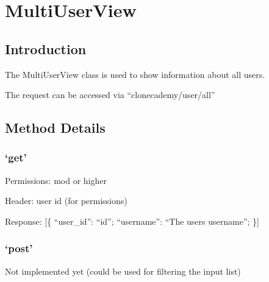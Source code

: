 \chapter*{MultiUserView}

\section*{Introduction}\label{introduction}

The MultiUserView class is used to show information about all users.

The request can be accessed via ``clonecademy/user/all''

\section*{Method Details}\label{method-details}

\subsection*{\texorpdfstring{`get'}{get}}\label{get}

Permissions: mod or higher

Header: user id (for permissions)

Response: {[}\{ ``user\_id'': ``id''; ``username'': ``The users
username''; \}{]}

\subsection*{\texorpdfstring{`post'}{post}}\label{post}

Not implemented yet (could be used for filtering the input list)

